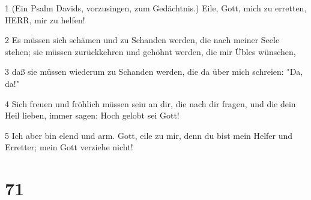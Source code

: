 \par 1 (Ein Psalm Davids, vorzusingen, zum Gedächtnis.) Eile, Gott, mich zu erretten, HERR, mir zu helfen!
\par 2 Es müssen sich schämen und zu Schanden werden, die nach meiner Seele stehen; sie müssen zurückkehren und gehöhnt werden, die mir Übles wünschen,
\par 3 daß sie müssen wiederum zu Schanden werden, die da über mich schreien: "Da, da!"
\par 4 Sich freuen und fröhlich müssen sein an dir, die nach dir fragen, und die dein Heil lieben, immer sagen: Hoch gelobt sei Gott!
\par 5 Ich aber bin elend und arm. Gott, eile zu mir, denn du bist mein Helfer und Erretter; mein Gott verziehe nicht!

\chapter{71}

